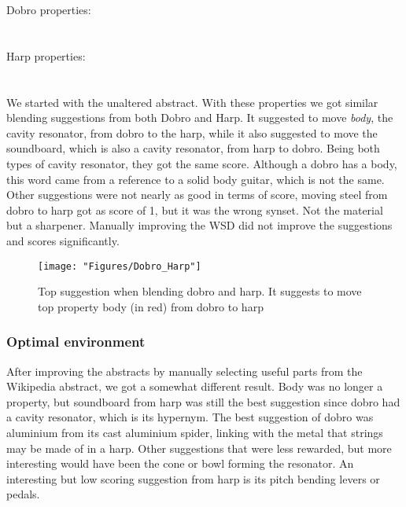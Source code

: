 Dobro properties:\\
\noindent{}
\\\\Harp properties:\\
\noindent{}
\\\\We started with the unaltered abstract.
With these properties we got similar blending suggestions from both Dobro and Harp. It suggested to move \emph{body}, the cavity resonator, from dobro to the harp, while it also suggested to move the soundboard, which is also a cavity resonator, from harp to dobro. Being both types of cavity resonator, they got the same score. Although a dobro has a body, this word came from a reference to a solid body guitar, which is not the same. Other suggestions were not nearly as good in terms of score, moving steel from dobro to harp got as score of 1, but it was the wrong synset. Not the material but a sharpener. Manually improving the WSD did not improve the suggestions and scores significantly. 
		
\begin{figure} \centering \texttt{[image: "Figures/Dobro\_Harp"]} \caption[Blending dobro and harp]{Top suggestion when blending dobro and harp. It suggests to move top property body (in red) from dobro to harp} \label{Dobro-Harp} \end{figure}

\subsubsection{Optimal environment}

After improving the abstracts by manually selecting useful parts from the Wikipedia abstract, we got a somewhat different result. Body was no longer a property, but soundboard from harp was still the best suggestion since dobro had a cavity resonator, which is its hypernym. The best suggestion of dobro was aluminium from its cast aluminium spider, linking with the metal that strings may be made of in a harp. Other suggestions that were less rewarded, but more interesting would have been the cone or bowl forming the resonator. An interesting but low scoring suggestion from harp is its pitch bending levers or pedals.


